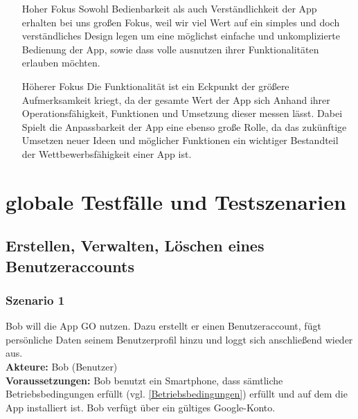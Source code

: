 \documentclass[parskip=full]{scrartcl}
\begin{document}
\begin{itemize}
	\item[Hoher Fokus] Sowohl Bedienbarkeit als auch Verständlichkeit der App erhalten bei uns großen Fokus, weil wir viel Wert auf ein simples und doch verständliches Design legen um eine möglichst einfache und unkomplizierte Bedienung der App, sowie dass volle ausnutzen ihrer Funktionalitäten erlauben möchten.
	
	\item[Höherer Fokus] Die Funktionalität ist ein Eckpunkt der größere Aufmerksamkeit kriegt, da der gesamte Wert der App sich Anhand ihrer Operationsfähigkeit, Funktionen und Umsetzung dieser messen lässt. Dabei Spielt die Anpassbarkeit der App eine ebenso große Rolle, da das zukünftige Umsetzen neuer Ideen und möglicher Funktionen ein wichtiger Bestandteil der Wettbewerbsfähigkeit einer App ist.
\end{itemize}


\newpage
\section{globale Testfälle und Testszenarien}

\subsection{Erstellen, Verwalten, Löschen eines Benutzeraccounts}

\subsubsection*{Szenario 1}Bob will die App GO nutzen. Dazu erstellt er einen Benutzeraccount, fügt persönliche Daten seinem Benutzerprofil hinzu und loggt sich anschließend wieder aus.\\

\textbf{Akteure:} Bob (Benutzer) \\

\textbf{Voraussetzungen: }Bob benutzt ein Smartphone, dass sämtliche Betriebsbedingungen erfüllt (vgl. \ref{Betriebsbedingungen}) erfüllt und auf dem die App installiert ist. Bob verfügt über ein gültiges Google-Konto.\\
\end{document}
